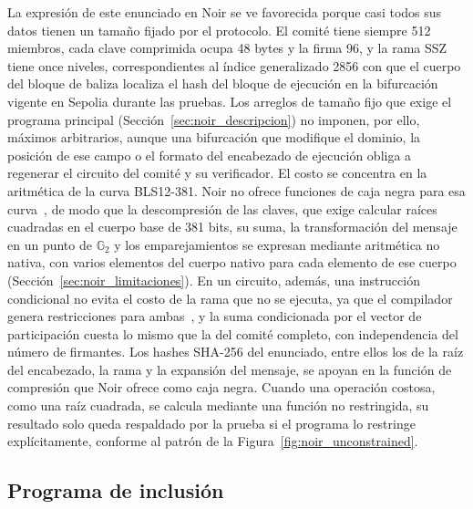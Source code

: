 La expresión de este enunciado en Noir se ve favorecida porque casi todos sus datos tienen un
tamaño fijado por el protocolo. El comité tiene siempre 512 miembros, cada clave comprimida ocupa
48 bytes y la firma 96, y la rama SSZ tiene once niveles, correspondientes al índice generalizado
2856 con que el cuerpo del bloque de baliza localiza el hash del bloque de ejecución en la
bifurcación vigente en Sepolia durante las pruebas. Los arreglos de tamaño fijo que exige el
programa principal (Sección~\ref{sec:noir_descripcion}) no imponen, por ello, máximos arbitrarios,
aunque una bifurcación que modifique el dominio, la posición de ese campo o el formato del
encabezado de ejecución obliga a regenerar el circuito del comité y su verificador. El costo se
concentra en la aritmética de la curva BLS12-381. Noir no ofrece funciones de caja negra para esa
curva~\cite{noirdocsbeta}, de modo que la descompresión de las claves, que exige calcular raíces
cuadradas en el cuerpo base de 381 bits, su suma, la transformación del mensaje en un punto de
$\mathbb{G}_2$ y los emparejamientos se expresan mediante aritmética no nativa, con varios
elementos del cuerpo nativo para cada elemento de ese cuerpo (Sección~\ref{sec:noir_limitaciones}).
En un circuito, además, una instrucción condicional no evita el costo de la rama que no se
ejecuta, ya que el compilador genera restricciones para ambas~\cite{noirdocsbeta}, y la suma
condicionada por el vector de participación cuesta lo mismo que la del comité completo, con
independencia del número de firmantes. Los hashes SHA-256 del enunciado, entre ellos los de la
raíz del encabezado, la rama y la expansión del mensaje, se apoyan en la función de compresión que
Noir ofrece como caja negra. Cuando una operación costosa, como una raíz cuadrada, se calcula
mediante una función no restringida, su resultado solo queda respaldado por la prueba si el
programa lo restringe explícitamente, conforme al patrón de la Figura~\ref{fig:noir_unconstrained}.

\subsection{Programa de inclusión}
\label{sec:noir_impl_inclusion}

